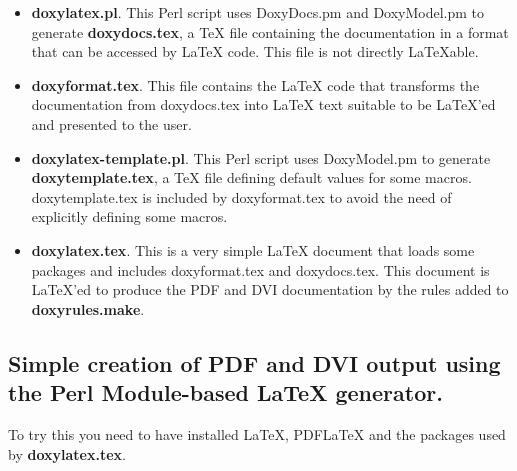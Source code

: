 \begin{itemize}
\item {\bf doxylatex.pl}. This Perl script uses DoxyDocs.pm and DoxyModel.pm to generate {\bf doxydocs.tex}, a TeX file containing the documentation in a format that can be accessed by LaTeX code. This file is not directly LaTeXable.

\item {\bf doxyformat.tex}. This file contains the LaTeX code that transforms the documentation from doxydocs.tex into LaTeX text suitable to be LaTeX'ed and presented to the user.

\item {\bf doxylatex-template.pl}. This Perl script uses DoxyModel.pm to generate {\bf doxytemplate.tex}, a TeX file defining default values for some macros. doxytemplate.tex is included by doxyformat.tex to avoid the need of explicitly defining some macros.

\item {\bf doxylatex.tex}. This is a very simple LaTeX document that loads some packages and includes doxyformat.tex and doxydocs.tex. This document is LaTeX'ed to produce the PDF and DVI documentation by the rules added to {\bf doxyrules.make}.

\end{itemize}
\hypertarget{perlmod_pm_pdf_gen}{}\subsection{Simple creation of PDF and DVI output using the Perl Module-based LaTeX generator.}\label{perlmod_pm_pdf_gen}
To try this you need to have installed LaTeX, PDFLaTeX and the packages used by {\bf doxylatex.tex}.

